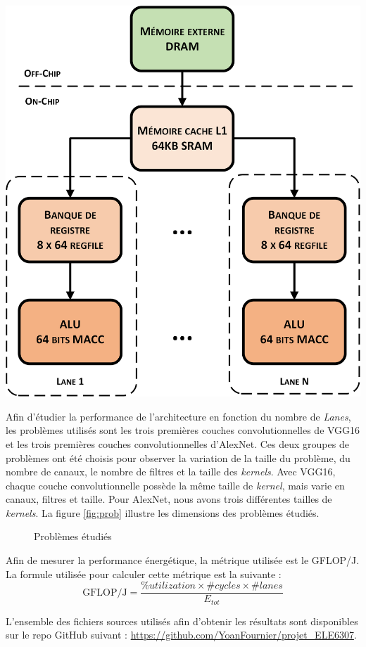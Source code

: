 \documentclass[10pt,letterpaper]{article}
\begin{document}
\begin{multicols}{2}
    {\centering
    \includegraphics[width=0.8\linewidth]{arch_visio.png}
    \captionsetup{hypcap=false}
    \label{fig:timeloop_arch}}
    \bigskip

    Afin d'étudier la performance de l'architecture en fonction du nombre de \textit{Lanes}, les problèmes utilisés sont 
    les trois premières couches convolutionnelles de VGG16 et les trois premières couches convolutionnelles d'AlexNet. 
    Ces deux groupes de problèmes ont été choisis pour observer la variation de la taille du problème, du nombre de canaux, 
    le nombre de filtres et la taille des \textit{kernels}. Avec VGG16, chaque couche convolutionnelle possède la même 
    taille de \textit{kernel}, mais varie en canaux, filtres et taille. Pour AlexNet, nous avons trois différentes tailles de \textit{kernels}.
    La figure \ref{fig:prob} illustre les dimensions des problèmes étudiés.
    
    \begin{figure}[H]
        \centering
        \caption{Problèmes étudiés}
        \label{fig:probs}
    \end{figure}

    Afin de mesurer la performance énergétique, la métrique utilisée est le GFLOP/J. La 
    formule utilisée pour calculer cette métrique est la suivante :
    $$\text{GFLOP/J} = \frac{\%utilization \times \#cycles \times \#lanes}{E_{tot}}$$

    L'ensemble des fichiers sources utilisés afin d'obtenir les résultats sont disponibles
    sur le repo GitHub suivant : \url{https://github.com/YoanFournier/projet_ELE6307}.

    \end{multicols}
\end{document}
